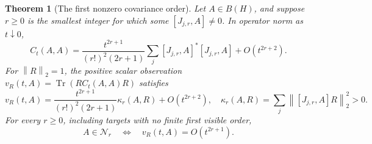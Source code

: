 \documentclass[11pt,a4paper]{amsart}
\numberwithin{equation}{section}
\newtheorem{theorem}{Theorem}[section]
\theoremstyle{definition}
\theoremstyle{remark}
\DeclareMathOperator{\Tr}{Tr}
\newcommand{\norm}[1]{\left\lVert#1\right\rVert}
\begin{document}
\begin{theorem}[The first nonzero covariance order]\label{thm:temporal_onset}
Let $A\in B(H)$, and suppose $r\ge0$ is the smallest integer for which some $[J_{j,r},A]\ne0$. In operator norm as $t\downarrow0$,
\begin{equation}\label{eq:temporal_onset}
 C_t(A,A)=\frac{t^{2r+1}}{(r!)^2(2r+1)}
     \sum_j[J_{j,r},A]^*[J_{j,r},A]+O(t^{2r+2}).
\end{equation}
For $\norm R_2=1$, the positive scalar observation $v_R(t,A)=\Tr(RC_t(A,A)R)$ satisfies
\begin{equation}\label{eq:temporal_readout}
 v_R(t,A)=\frac{t^{2r+1}}{(r!)^2(2r+1)}\kappa_r(A,R)+O(t^{2r+2}),
 \quad \kappa_r(A,R)=\sum_j\norm{[J_{j,r},A]R}_2^2>0.
\end{equation}
For every $r\ge0$, including targets with no finite first visible order,
\begin{equation}\label{eq:temporal_depth_iff}
 A\in\mathcal N_r\quad\Longleftrightarrow\quad v_R(t,A)=O(t^{2r+1}).
\end{equation}
\end{theorem}
\end{document}
